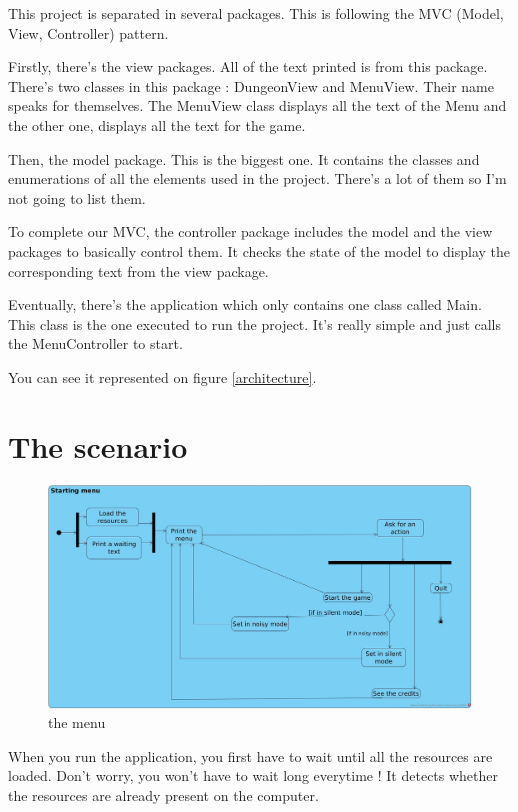 \documentclass[11pt]{extarticle}
\begin{document}
This project is separated in several packages. This is following the MVC (Model, View, Controller) pattern. 

Firstly, there's the view packages. All of the text printed is from this package. There's two classes in this package : DungeonView and MenuView. Their name speaks for themselves. The MenuView class displays all the text of the Menu and the other one, displays all the text for the game.

Then, the model package. This is the biggest one. It contains the classes and enumerations of all the elements used in the project. There's a lot of them so I'm not going to list them.

To complete our MVC, the controller package includes the model and the view packages to basically control them. It checks the state of the model to display the corresponding text from the view package.

Eventually, there's the application which only contains one class called Main. This class is the one executed to run the project. It's really simple and just calls the MenuController to start.

You can see it represented on figure \ref{architecture}.

\section{The scenario}

\begin{figure}[hb]
    \centering
    
    \caption{the menu}
    \label{menu}
    \includegraphics[scale = 0.198]{menu}
\end{figure}

When you run the application, you first have to wait until all the resources are loaded. Don't worry, you won't have to wait long everytime ! It detects whether the resources are already present on the computer. 
\end{document}

